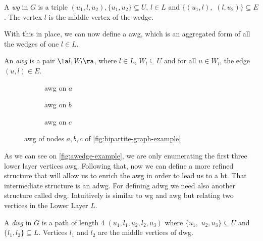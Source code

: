 \begin{definition}[\acrfull{wg}]\label{def:wg}
A \textit{\acrfull{wg}} in $G$ is a triple $(u_1,l,u_2), \{u_1,u_2\}\subseteq U$, $l \in L$ and $\{(u_1,l),$ $(l,u_2)\} \subseteq E$. The vertex $l$ is the middle vertex of the wedge. 
\end{definition}
With this  in place, we can now define a \acrshort{awg}, which is an aggregated form of all the wedges of one $l \in L$.
      
\begin{definition}\label{def:awg}
An \textit{\acrfull{awg}} is a pair $\la l, W_l \ra$, where $l \in L$, $W_l \subseteq U$ and for all $u\in W_l$, the edge  $(u,l)\in E$. 
\end{definition}

\begin{figure}[htp!]
\begin{subfigure}[b]{0.3\textwidth}
\centering
{}
\caption{\acrshort{awg} on $a$}
\label{fig:awedge-example-a}
\end{subfigure}
\begin{subfigure}[b]{0.3\textwidth}
\centering
{}
\caption{\acrshort{awg} on $b$}
\label{fig:awedge-example-b}
\end{subfigure}
\begin{subfigure}[b]{0.3\textwidth}
\centering
{}
\caption{\acrshort{awg} on $c$}
\label{fig:awedge-example-c}
\end{subfigure}
\caption[{[\acrshort{iebt}] Definitions Examples \acrlong{awg}}]{ \acrlong{awg} of nodes $a,b,c$ of \autoref{fig:bipartite-graph-example}}
\label{fig:awedge-example}
\end{figure}

As we can see on \autoref{fig:awedge-example}, we are only enumerating the first three lower layer vertices \acrshort{awg}.
Following that, now we can define a more refined structure that will allow us to enrich the \acrshort{awg} in order to lead us to a \acrshort{bt}. 
That intermediate structure is an \acrlong{adwg}. For defining \acrshort{adwg} we need also another structure called \acrlong{dwg}. Intuitively is similar to \acrshort{wg} and \acrshort{awg} but relating two vertices in the Lower Layer $L$.

\begin{definition}
A \textit{\acrfull{dwg}} in $G$ is a path of length 4 $(u_1,l_1,u_2,l_2,u_3)$ where  $\{u_1,$ $u_2,u_3\}\subseteq U$ and $\{l_1,l_2\}\subseteq L$. Vertices $l_1$ and $l_2$ are the middle vertices of \acrshort{dwg}. 
\end{definition}
      
